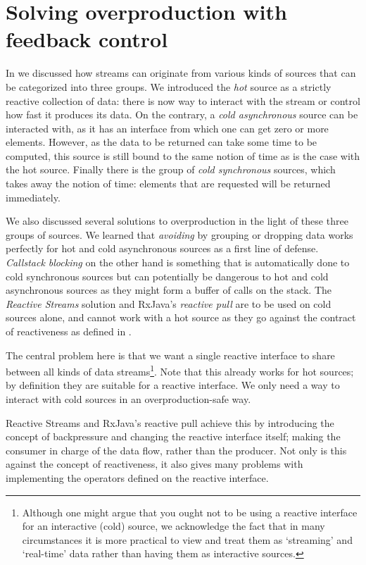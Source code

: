 \chapter{Solving overproduction with feedback control}
\label{chap:solving-overproduction}

In  we discussed how streams can originate from various kinds of sources that can be categorized into three groups. We introduced the \textit{hot} source as a strictly reactive collection of data: there is now way to interact with the stream or control how fast it produces its data. On the contrary, a \textit{cold asynchronous} source can be interacted with, as it has an interface from which one can get zero or more elements. However, as the data to be returned can take some time to be computed, this source is still bound to the same notion of time as is the case with the hot source. Finally there is the group of \textit{cold synchronous} sources, which takes away the notion of time: elements that are requested will be returned immediately.

We also discussed several solutions to overproduction in the light of these three groups of sources. We learned that \textit{avoiding} by grouping or dropping data works perfectly for hot and cold asynchronous sources as a first line of defense. \textit{Callstack blocking} on the other hand is something that is automatically done to cold synchronous sources but can potentially be dangerous to hot and cold asynchronous sources as they might form a buffer of calls on the stack. The \textit{Reactive Streams} solution and RxJava's \textit{reactive pull} are to be used on cold sources alone, and cannot work with a hot source as they go against the contract of reactiveness as defined in \cite{berry1991-Reactive}.

The central problem here is that we want a single reactive interface to share between all kinds of data streams\footnote{Although one might argue that you ought not to be using a reactive interface for an interactive (cold) source, we acknowledge the fact that in many circumstances it is more practical to view and treat them as `streaming' and `real-time' data rather than having them as interactive sources.}. Note that this already works for hot sources; by definition they are suitable for a reactive interface. We only need a way to interact with cold sources in an overproduction-safe way.

Reactive Streams and RxJava's reactive pull achieve this by introducing the concept of backpressure and changing the reactive interface itself; making the consumer in charge of the data flow, rather than the producer. Not only is this against the concept of reactiveness, it also gives many problems with implementing the operators defined on the reactive interface.

